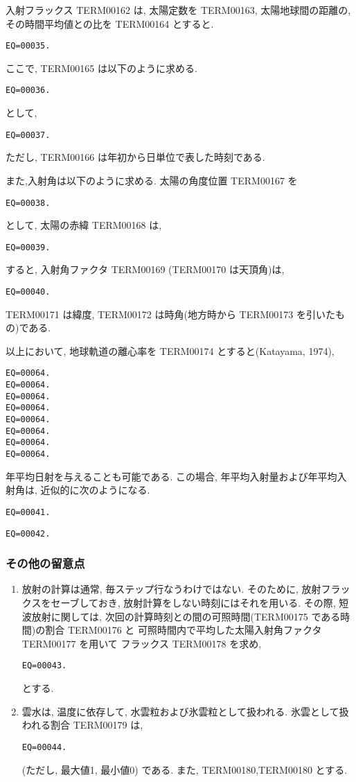 入射フラックス TERM00162 は,
太陽定数を TERM00163, 
太陽地球間の距離の, 
その時間平均値との比を TERM00164 とすると.
%
\begin{verbatim}
EQ=00035.
\end{verbatim}
ここで, TERM00165 は以下のように求める.
%
\begin{verbatim}
EQ=00036.
\end{verbatim}
として,
\begin{verbatim}
EQ=00037.
\end{verbatim}
ただし, TERM00166 は年初から日単位で表した時刻である.

また,入射角は以下のように求める.
太陽の角度位置 TERM00167 を
\begin{verbatim}
EQ=00038.
\end{verbatim}
として,  太陽の赤緯 TERM00168 は,
\begin{verbatim}
EQ=00039.
\end{verbatim}
%
すると, 入射角ファクタ TERM00169 (TERM00170 は天頂角)は,
\begin{verbatim}
EQ=00040.
\end{verbatim}
TERM00171 は緯度,
TERM00172 は時角(地方時から TERM00173 を引いたもの)である.

以上において, 地球軌道の離心率を TERM00174 とすると(Katayama, 1974),
\begin{verbatim}
EQ=00064.
EQ=00064.
EQ=00064.
EQ=00064.
EQ=00064.
EQ=00064.
EQ=00064.
EQ=00064.
\end{verbatim}

年平均日射を与えることも可能である.
この場合, 年平均入射量および年平均入射角は, 
近似的に次のようになる.
%
\begin{verbatim}
EQ=00041.
\end{verbatim}
%
\begin{verbatim}
EQ=00042.
\end{verbatim}

\subsubsection{その他の留意点}

\begin{enumerate}
\item 放射の計算は通常, 毎ステップ行なうわけではない.
      そのために, 放射フラックスをセーブしておき, 
      放射計算をしない時刻にはそれを用いる.
      その際, 短波放射に関しては,
      次回の計算時刻との間の可照時間(TERM00175 である時間)の割合 TERM00176 と
      可照時間内で平均した太陽入射角ファクタ TERM00177 を用いて
      フラックス TERM00178 を求め,
      \begin{verbatim}
EQ=00043.
\end{verbatim}
      とする.


\item 雲水は, 温度に依存して, 
      水雲粒および氷雲粒として扱われる.
      氷雲として扱われる割合 TERM00179 は,
      \begin{verbatim}
EQ=00044.
\end{verbatim}
      (ただし, 最大値1, 最小値0) である. また,
      TERM00180,TERM00180 とする.

\end{enumerate}




